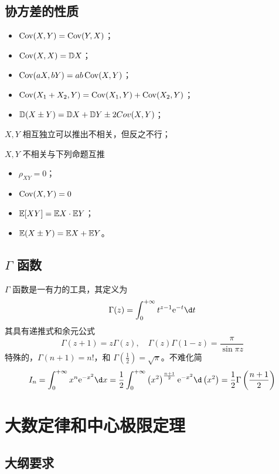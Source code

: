 \subsection*{协方差的性质}

\begin{itemize}
	\item $\operatorname{Cov}(X, Y) = \operatorname{Cov}(Y, X)$；
	\item $\operatorname{Cov}(X, X) = \mathbb{D} X$；
	\item $\operatorname{Cov}(aX, bY) = ab \operatorname{Cov}(X, Y)$；
	\item $\operatorname{Cov}(X_1 + X_2, Y) = \operatorname{Cov}(X_1, Y) + \operatorname{Cov}(X_2, Y)$；
	\item $\mathbb{D}(X \pm Y) = \mathbb{D} X + \mathbb{D} Y \pm 2Cov(X, Y)$；
\end{itemize}

$X, Y$ 相互独立可以推出不相关，但反之不行；

$X, Y$ 不相关与下列命题互推
\begin{itemize}
	\item $\rho_{XY} = 0$；
	\item $\operatorname{Cov}(X, Y) = 0$
	\item $\mathbb{E}[XY] = \mathbb{E} X \cdot \mathbb{E} Y$；
	\item $\mathbb{E}(X \pm Y) = \mathbb{E} X + \mathbb{E} Y$。
\end{itemize}

\subsection{\texorpdfstring{$\Gamma$ 函数}{Γ 函数}}

$\Gamma$ 函数是一有力的工具，其定义为
\[ \Gamma(z) = \int_{0}^{+\infty} t^{z-1} \ee^{-t} \d t \]
其具有递推式和余元公式
\[ \Gamma(z + 1) = z \Gamma(z), \quad \Gamma(z) \Gamma(1-z) = \frac{\pi}{\sin \pi z} \]
特殊的，$\Gamma(n + 1) = n!$，和 $\Gamma(\frac{1}{2}) = \sqrt{\pi}$。不难化简
\[ I_n = \int_{0}^{+\infty} x^n \ee^{-x^2} \d x = \frac{1}{2} \int_{0}^{+\infty} \left(x^2\right)^{\frac{n+1}{2}} \ee^{-x^2} \d \left(x^2\right) = \frac{1}{2} \Gamma\left(\frac{n+1}{2}\right)  \]

\section{大数定律和中心极限定理}

\subsection{大纲要求}

